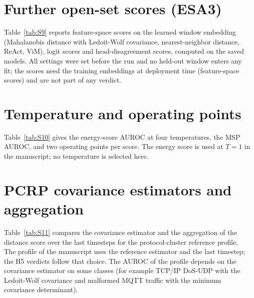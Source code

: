 \documentclass[10pt,a4paper]{article}
\begin{document}
\section{Further open-set scores (ESA3)}\label{sec:n7}
Table~\ref{tab:S9} reports feature-space scores on the learned window embedding (Mahalanobis distance with Ledoit-Wolf covariance, nearest-neighbor distance, ReAct, ViM), logit scores and head-disagreement scores, computed on the saved models. All settings were set before the run and no held-out window enters any fit; the scores need the training embeddings at deployment time (feature-space scores) and are not part of any verdict.


\section{Temperature and operating points}\label{sec:n8}
Table~\ref{tab:S10} gives the energy-score AUROC at four temperatures, the MSP AUROC, and two operating points per score. The energy score is used at $T = 1$ in the manuscript; no temperature is selected here.


\section{PCRP covariance estimators and aggregation}\label{sec:n9}
Table~\ref{tab:S11} compares the covariance estimator and the aggregation of the distance score over the last timesteps for the protocol-cluster reference profile. The profile of the manuscript uses the reference estimator and the last timestep; the H5 verdicts follow that choice. The AUROC of the profile depends on the covariance estimator on some classes (for example TCP/IP DoS-UDP with the Ledoit-Wolf covariance and malformed MQTT traffic with the minimum covariance determinant).

\end{document}
